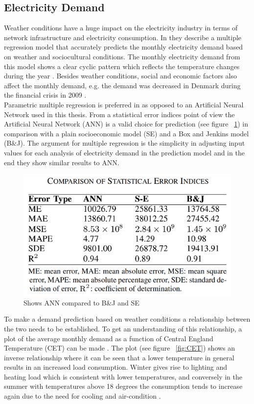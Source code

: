 \documentclass[twoside,11pt,openright]{report}
\begin{document}
\subsection{Electricity Demand}
Weather conditions have a huge impact on the electricity industry in terms of network infrastructure and electricity consumption. In \cite{19} they describe a multiple regression model that accurately predicts the monthly electricity demand based on weather and sociocultural conditions. The monthly electricity demand from this model shows a clear cyclic pattern which reflects the temperature changes during the year \cite{19}. Besides weather conditions, social and economic factors also affect the monthly demand, e.g. the demand was decreased in Denmark during the financial crisis in 2009 \cite{20}. 
\\[0.5cm]
Parametric multiple regression is preferred in \cite{19} as opposed to an Artificial Neural Network used in this thesis. From a statistical error indices point of view the Artificial Neural Network (ANN) is a valid choice for prediction (see figure ~\ref{fig:anncomparison}) in comparison with a plain socioeconomic model (SE) and a Box and Jenkins model (B\&J). The argument for multiple regression is the simplicity in adjusting input values for each analysis of electricity demand in the prediction model and in the end they show similar results to ANN. 
\begin{figure}[h!]
\centering
\includegraphics[width=0.8\linewidth,natwidth=898,natheight=587]{billeder/StatisticalErrorOfNeuralNetworksAndRegression.png}
\caption{Shows ANN compared to B\&J and SE \cite{19} }
\label{fig:anncomparison}
\end{figure}
To make a demand prediction based on weather conditions a relationship between the two needs to be established. To get an understanding of this relationship, a plot of the average monthly demand as a function of Central England Temperature (CET) can be made \cite{19}. The plot (see figure ~\ref{fig:CET}) shows an inverse relationship where it can be seen that a lower temperature in general results in an increased load consumption. Winter gives rise to lighting and heating load which is consistent with lower temperatures, and conversely in the summer with temperatures above 18 degrees the consumption tends to increase again due to the need for cooling and air-condition \cite{19}.
\end{document}
